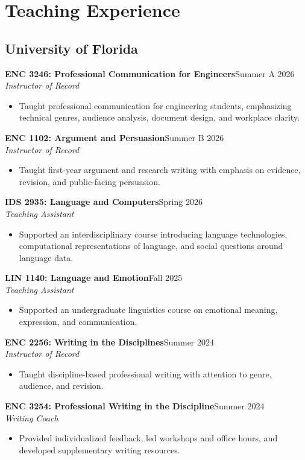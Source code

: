 \documentclass[11pt,letterpaper]{article}
\newcommand{\role}[3]{\textbf{#1}\hfill #2\\\textit{#3}\\}
\begin{document}
\section*{Teaching Experience}
\subsection*{University of Florida}
\role{ENC 3246: Professional Communication for Engineers}{Summer A 2026}{Instructor of Record}
\begin{itemize}
\item Taught professional communication for engineering students, emphasizing technical genres, audience analysis, document design, and workplace clarity.
\end{itemize}

\role{ENC 1102: Argument and Persuasion}{Summer B 2026}{Instructor of Record}
\begin{itemize}
\item Taught first-year argument and research writing with emphasis on evidence, revision, and public-facing persuasion.
\end{itemize}

\role{IDS 2935: Language and Computers}{Spring 2026}{Teaching Assistant}
\begin{itemize}
\item Supported an interdisciplinary course introducing language technologies, computational representations of language, and social questions around language data.
\end{itemize}

\role{LIN 1140: Language and Emotion}{Fall 2025}{Teaching Assistant}
\begin{itemize}
\item Supported an undergraduate linguistics course on emotional meaning, expression, and communication.
\end{itemize}

\role{ENC 2256: Writing in the Disciplines}{Summer 2024}{Instructor of Record}
\begin{itemize}
\item Taught discipline-based professional writing with attention to genre, audience, and revision.
\end{itemize}

\role{ENC 3254: Professional Writing in the Discipline}{Summer 2024}{Writing Coach}
\begin{itemize}
\item Provided individualized feedback, led workshops and office hours, and developed supplementary writing resources.
\end{itemize}
\end{document}

